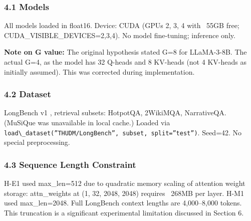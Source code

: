 
\subsubsection{4.1 Models}

\begin{table}[htbp]
\centering
{}
\end{table}

All models loaded in float16. Device: CUDA (GPUs 2, 3, 4 with ~55GB free; CUDA\_VISIBLE\_DEVICES=2,3,4). No model fine-tuning; inference only.

\textbf{Note on G value:} The original hypothesis stated G=8 for LLaMA-3-8B. The actual G=4, as the model has 32 Q-heads and 8 KV-heads (not 4 KV-heads as initially assumed). This was corrected during implementation.

\subsubsection{4.2 Dataset}

LongBench v1 \citep{Bai2023LongBench}, retrieval subsets: HotpotQA, 2WikiMQA, NarrativeQA. (MuSiQue was unavailable in local cache.) Loaded via \texttt{load\textbackslash \_dataset(''THUDM/LongBench'', subset, split=''test'')}. Seed=42. No special preprocessing.

\subsubsection{4.3 Sequence Length Constraint}

H-E1 used max\_len=512 due to quadratic memory scaling of attention weight storage: attn\_weights at (1, 32, 2048, 2048) requires ~268MB per layer. H-M1 used max\_len=2048. Full LongBench context lengths are 4,000--8,000 tokens. This truncation is a significant experimental limitation discussed in Section 6.

